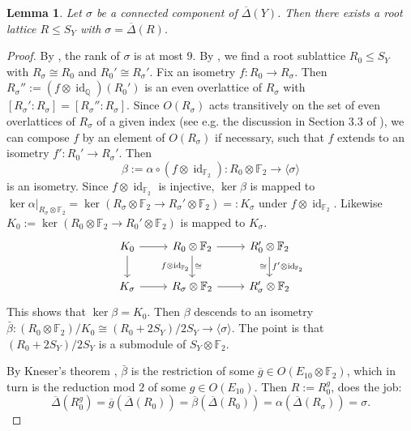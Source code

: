 \documentclass[a4paper]{amsart}
\theoremstyle{definition}
\theoremstyle{plain}
\newtheorem{lemma}[definition]{Lemma}
\DeclareMathOperator{\id}{id}
\newcommand{\QQ}{\mathbb{Q}}
\newcommand{\FF}{\mathbb{F}}
\newcommand{\DeltabarY}{\overline{\Delta}(Y)}
\begin{document}
\begin{lemma}\label{lem:existsRwithDeltaRequalSigma}
Let $\sigma$ be a connected component of $\DeltabarY$.
Then there exists a root lattice $R \leq S_Y$ with $\sigma=\overline{\Delta}(R)$.
\end{lemma}
\begin{proof}

By , the rank of $\sigma$ is at most $9$. By , we find a root sublattice $R_0 \leq S_Y$ with $R_\sigma \cong R_0$ and $R_0' \cong R_\sigma'$.
Fix an isometry $f\colon R_0 \to R_\sigma$. 
Then $R_\sigma'':=(f\otimes \id_{\QQ})(R_0')$ is an even overlattice of $R_\sigma$ with $[R_\sigma':R_\sigma]=[R_\sigma'':R_\sigma]$.
Since $O(R_\sigma)$ acts transitively on the set of even overlattices of $R_\sigma$ of a given index (see e.g. the discussion in Section 3.3 of \cite{ebeling:lattices-and-codes}), we can compose $f$ by an element of $O(R_\sigma)$ if necessary, such that $f$ extends to an isometry $f'\colon R_0' \to R_\sigma'$. 
Then 
\[\beta:=\alpha\circ(f\otimes \id_{\FF_2}) \colon R_0\otimes \FF_2 \to \langle \sigma \rangle\]
is an isometry. Since $f \otimes \id_{\FF_2}$ is injective, $\ker \beta$ is mapped to $\ker \alpha|_{R_\sigma \otimes \FF_2}= \ker(R_\sigma \otimes \FF_2 \to R_\sigma'\otimes \FF_2)=:K_\sigma$ under $f\otimes \id_{\FF_2}$. Likewise $K_0:=\ker (R_0 \otimes \FF_2 \to R_0' \otimes \FF_2)$ is mapped to $K_\sigma$.
$$\begin{tikzcd}
K_0 \arrow[r]\arrow[d]& R_0\otimes\FF_2 \arrow[r] \arrow[d, "\cong", "f\otimes\id_{\FF_2}"'] & R_0'\otimes\FF_2 \arrow[d, "\cong"', "f'\otimes\id_{\FF_2}"] \\
K_\sigma \arrow[r]& R_{\sigma}\otimes\FF_2 \arrow[r]                      & R_{\sigma}'\otimes\FF_2             
\end{tikzcd}$$
This shows that $\ker \beta =K_0.$
Then $\beta$ descends to an isometry $\bar \beta\colon (R_0\otimes \FF_2) /K_0 \cong (R_0+2S_Y)/2S_Y \to \langle \sigma \rangle$.
The point is that $(R_0+2S_Y)/2S_Y$ is a submodule of $S_Y \otimes \FF_2$.

By Kneser's theorem \cite[(4.4)]{kneser}, $\bar \beta$ is the restriction of some $\overline{g}\in O(E_{10}\otimes \FF_2)$, which in turn is the reduction mod $2$ of some $g \in O(E_{10})$. 
Then $R:=R_0^g$, does the job:
\[\overline{\Delta}(R_0^g)=\overline{g}(\overline{\Delta}(R_0))=\overline{\beta}(\overline{\Delta}(R_0))=\alpha(\overline{\Delta}(R_\sigma))=\sigma.\]
\end{proof}
\end{document}
